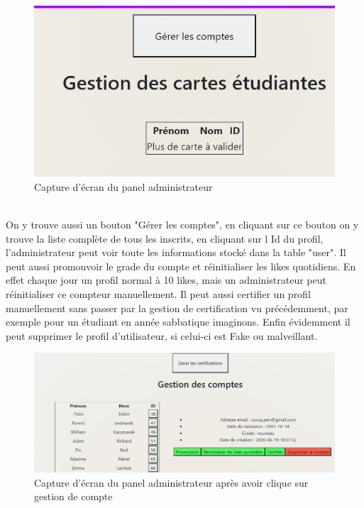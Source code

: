 \documentclass[12pt]{report}
\begin{document}
\begin{figure}[h!]
	\begin{center}
		\includegraphics[scale=0.7]{gestioncarte.jpg}
	\end{center}
		\caption{Capture d'écran du panel administrateur }
\end{figure}\\
On y trouve aussi un bouton "Gérer les comptes", en cliquant sur ce bouton on y trouve la liste complète de tous les inscrits, en cliquant sur l Id du profil, l'administrateur peut voir toute les informations stocké dans la table "user". Il peut aussi promouvoir le grade du compte et réinitialiser les likes quotidiens. En effet chaque jour un profil normal à 10 likes, mais un administrateur peut réinitialiser ce compteur manuellement. Il peut aussi certifier un profil manuellement sans passer par la gestion de certification vu précédemment, par exemple pour un étudiant en année sabbatique imaginons. Enfin évidemment il peut supprimer le profil d'utilisateur, si celui-ci est Fake ou malveillant.
\begin{figure}[h!]
	\begin{center}
		\includegraphics[scale=0.6]{gestioncompte.jpg}
	\end{center}
		\caption{Capture d'écran du panel administrateur après avoir clique sur gestion de compte}
\end{figure}\\
\clearpage
\end{document}
